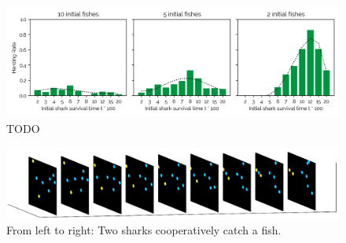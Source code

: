 \documentclass[letterpaper]{article}
\begin{document}
\begin{figure}[t]
\begin{center}
\includegraphics[width=\textwidth]{figures/herding.png}
\caption{TODO}
\label{fig:herding}
\end{center}
\end{figure}

\begin{figure}[t]
\begin{center}
\includegraphics[width=\textwidth]{figures/coop_movie_frames2.png}
\caption{From left to right: Two sharks cooperatively catch a fish.}
\label{fig:coop_movie}
\end{center}
\end{figure}
\end{document}
